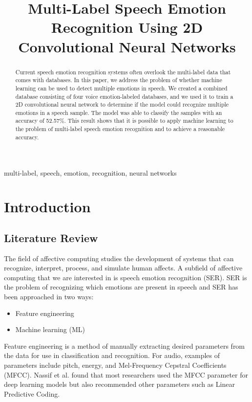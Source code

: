 \documentclass[conference]{IEEEtran}
\begin{document}
\title{Multi-Label Speech Emotion Recognition Using 2D Convolutional Neural Networks}

\author{
}

\maketitle

\begin{abstract}
Current speech emotion recognition systems often overlook the multi-label data that comes with databases. In this paper, we address the problem of whether machine learning can be used to detect multiple emotions in speech. We created a combined database consisting of four voice emotion-labeled databases, and we used it to train a 2D convolutional neural network to determine if the model could recognize multiple emotions in a speech sample. The model was able to classify the samples with an accuracy of 52.57\%. This result shows that it is possible to apply machine learning to the problem of multi-label speech emotion recognition and to achieve a reasonable accuracy.
\end{abstract}

\begin{IEEEkeywords}
multi-label, speech, emotion, recognition, neural networks
\end{IEEEkeywords}

\section{Introduction}

\subsection{Literature Review}

The field of affective computing studies the development of systems that can recognize, interpret, process, and simulate human affects. A subfield of affective computing that we are interested in is speech emotion recognition (SER). SER is the problem of recognizing which emotions are present in speech and SER has been approached in two ways:
\begin{itemize}
	\item Feature engineering
	\item Machine learning (ML)
\end{itemize} 
Feature engineering is a method of manually extracting desired parameters from the data for use in classification and recognition. For audio, examples of parameters include pitch, energy, and Mel-Frequency Cepstral Coefficients (MFCC).\cite{Rybka2013} Nassif et al. \cite{Nassif2019} found that most researchers used the MFCC parameter for deep learning models but also recommended other parameters such as Linear Predictive Coding. 
\end{document}
